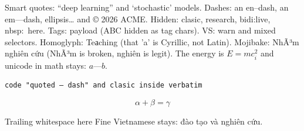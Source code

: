 \documentclass{article}
\begin{document}
Smart quotes: “deep learning” and ‘stochastic’ models.
Dashes: an en–dash, an em—dash, ellipsis… and © 2026 ACME.
Hidden: cla​sic, re­search, bidi:‮evil‬, nbsp: here.
Tags: pay​load󠁁󠁂󠁃 (ABC hidden as tag chars).
VS: warn️󠄁 and mixed󠅂 selectors.
Homoglyph: Teаching (that 'a' is Cyrillic, not Latin).
Mojibake: NhÃ³m nghiên cứu (NhÃ³m is broken, nghiên is legit).
The energy is $E = mc^2_i​$ and unicode in math stays: $a — b$.

\begin{verbatim}
code "quoted — dash" and cla​sic inside verbatim
\end{verbatim}

\begin{equation}
\alpha + ­\beta = \gamma
\end{equation}

Trailing whitespace here   
Fine Vietnamese stays: đào tạo và nghiên cứu.
\end{document}
